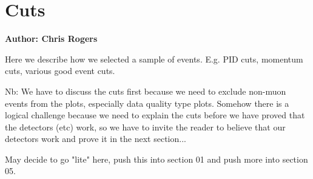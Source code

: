 \section{Cuts}
\label{Sect:Cuts-1}

\textbf{Author: Chris Rogers}

Here we describe how we selected a sample of events. E.g. PID cuts, momentum
cuts, various good event cuts.

Nb: We have to discuss the cuts first because we need to exclude non-muon events
from the plots, especially data quality type plots. Somehow there is a logical 
challenge because we need to explain the cuts before we have proved that the 
detectors (etc) work, so we have to invite the reader to believe that our 
detectors work and prove it in the next section...

May decide to go "lite" here, push this into section 01 and push more into section 05.



